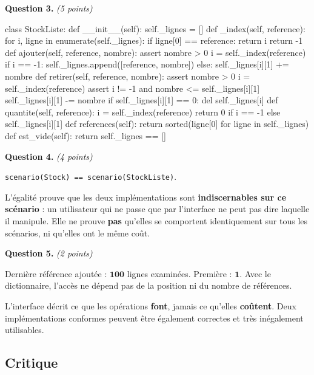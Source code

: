 \medskip
\textbf{Question 3.} \emph{(5 points)}

\begin{python}
class StockListe:
    def __init__(self):
        self._lignes = []
    def _index(self, reference):
        for i, ligne in enumerate(self._lignes):
            if ligne[0] == reference:
                return i
        return -1
    def ajouter(self, reference, nombre):
        assert nombre > 0
        i = self._index(reference)
        if i == -1:
            self._lignes.append([reference, nombre])
        else:
            self._lignes[i][1] += nombre
    def retirer(self, reference, nombre):
        assert nombre > 0
        i = self._index(reference)
        assert i != -1 and nombre <= self._lignes[i][1]
        self._lignes[i][1] -= nombre
        if self._lignes[i][1] == 0:
            del self._lignes[i]
    def quantite(self, reference):
        i = self._index(reference)
        return 0 if i == -1 else self._lignes[i][1]
    def references(self):
        return sorted(ligne[0] for ligne in self._lignes)
    def est_vide(self):
        return self._lignes == []
\end{python}

\medskip
\textbf{Question 4.} \emph{(4 points)}

\lstinline{scenario(Stock) == scenario(StockListe)}.

L'égalité prouve que les deux implémentations sont \textbf{indiscernables sur
ce scénario} : un utilisateur qui ne passe que par l'interface ne peut pas
dire laquelle il manipule. Elle ne prouve \textbf{pas} qu'elles se comportent
identiquement sur tous les scénarios, ni qu'elles ont le même coût.

\medskip
\textbf{Question 5.} \emph{(2 points)}

Dernière référence ajoutée : $\mathbf{100}$ lignes examinées. Première :
$\mathbf{1}$. Avec le dictionnaire, l'accès ne dépend pas de la position ni du
nombre de références.

L'interface décrit ce que les opérations \textbf{font}, jamais ce qu'elles
\textbf{coûtent}. Deux implémentations conformes peuvent être également
correctes et très inégalement utilisables.

\subsection*{Critique}

